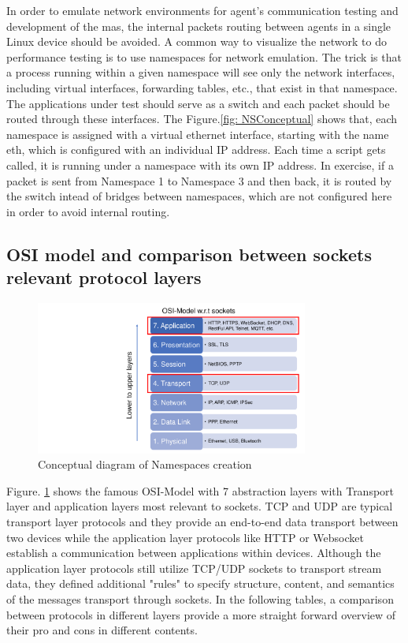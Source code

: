 In order to emulate network environments for agent's communication testing and development of the \gls{mas}, the internal packets routing between agents in a single Linux device should be avoided. A common way to visualize the network to do performance testing is to use namespaces for network emulation. The trick is that a process running within a given namespace will see only the network interfaces, including virtual interfaces, forwarding tables, etc., that exist in that namespace. The applications under test should serve as a switch and each packet should be routed through these interfaces. The Figure.\ref{fig: NSConceptual} shows that, each namespace is assigned with a virtual ethernet interface, starting with the name eth, which is configured with an individual IP address. Each time a script gets called, it is running under a namespace with its own IP address. In exercise, if a packet is sent from Namespace 1 to Namespace 3 and then back, it is routed by the switch intead of bridges between namespaces, which are not configured here in order to avoid internal routing.

\subsection{OSI model and comparison between sockets relevant protocol layers}
\begin{figure}[htbp]
\includegraphics[width=0.8\textwidth]{figures/OSI.pdf}
\centering
\caption{Conceptual diagram of Namespaces creation\label{fig: OSI}}
\end{figure}

Figure. \ref{fig: OSI} shows the famous OSI-Model with 7 abstraction layers with Transport layer and application layers most relevant to sockets. 
TCP and UDP are typical transport layer protocols and they provide an end-to-end data transport between two devices while the application layer protocols like HTTP or Websocket establish a communication between applications within devices. 
Although the application layer protocols still utilize TCP/UDP sockets to transport stream data, they defined additional "rules" to specify structure, content, and semantics of the messages transport through sockets. 
In the following tables, a comparison between protocols in different layers provide a more straight forward overview of their pro and cons in different contents.


